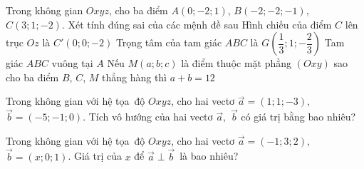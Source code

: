 \begin{ex}%
	Trong không gian $Oxyz$, cho ba điểm  $A(0;-2;1)$, $B(-2;-2;-1)$, $C(3;1;-2)$. Xét tính đúng sai của các mệnh đề sau
	\choiceTF 
		{\True Hình chiếu của điểm  $C$ lên trục $Oz$ là $C'(0;0;-2)$}
		{Trọng tâm của tam giác  $ABC$ là $G \left(\dfrac{1}{3};1;-\dfrac{2}{3} \right)$}
		{\True Tam  giác $ABC$ vuông tại $A$}
		{Nếu $M(a;b;c)$  là điểm thuộc mặt phẳng $(Oxy)$ sao cho ba điểm $B$, $C$, $M$ thẳng hàng thì $a+b=12$}
\end{ex}



\begin{bt}%
	Trong không gian với hệ tọa~độ $Oxyz$, cho hai vectơ $\overrightarrow{a}=(1; 1;-3), $ $\overrightarrow{b}=(-5;-1; 0)$.  Tích vô hướng của hai vectơ $\overrightarrow{a},$ $ \overrightarrow{b}$ có giá trị bằng bao nhiêu?
\end{bt}

\begin{bt}%
	Trong  không gian với hệ tọa~độ $Oxyz$, cho hai vectơ $\overrightarrow{a}=(-1; 3; 2), $ $\overrightarrow{b}=(x; 0; 1)$. Giá trị của $x$ để $\overrightarrow{a}\perp \overrightarrow{b}$~là bao nhiêu?
\end{bt}

